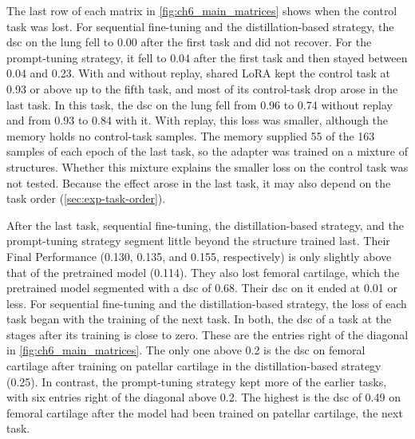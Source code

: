 The last row of each matrix in \cref{fig:ch6_main_matrices} shows when the control task was lost.
For sequential fine-tuning and the distillation-based strategy, the \gls{dsc} on the lung fell to 0.00 after the first task and did not recover.
For the prompt-tuning strategy, it fell to 0.04 after the first task and then stayed between 0.04 and 0.23.
With and without replay, shared LoRA kept the control task at 0.93 or above up to the fifth task, and most of its control-task drop arose in the last task.
In this task, the \gls{dsc} on the lung fell from 0.96 to 0.74 without replay and from 0.93 to 0.84 with it.
With replay, this loss was smaller, although the memory holds no control-task samples.
The memory supplied 55 of the 163 samples of each epoch of the last task, so the adapter was trained on a mixture of structures.
Whether this mixture explains the smaller loss on the control task was not tested.
Because the effect arose in the last task, it may also depend on the task order (\cref{sec:exp-task-order}).

After the last task, sequential fine-tuning, the distillation-based strategy, and the prompt-tuning strategy segment little beyond the structure trained last.
Their Final Performance (0.130, 0.135, and 0.155, respectively) is only slightly above that of the pretrained model (0.114).
They also lost femoral cartilage, which the pretrained model segmented with a \gls{dsc} of 0.68.
Their \gls{dsc} on it ended at 0.01 or less.
For sequential fine-tuning and the distillation-based strategy, the loss of each task began with the training of the next task.
In both, the \gls{dsc} of a task at the stages after its training is close to zero.
These are the entries right of the diagonal in \cref{fig:ch6_main_matrices}.
The only one above 0.2 is the \gls{dsc} on femoral cartilage after training on patellar cartilage in the distillation-based strategy (0.25).
In contrast, the prompt-tuning strategy kept more of the earlier tasks, with six entries right of the diagonal above 0.2.
The highest is the \gls{dsc} of 0.49 on femoral cartilage after the model had been trained on patellar cartilage, the next task.

